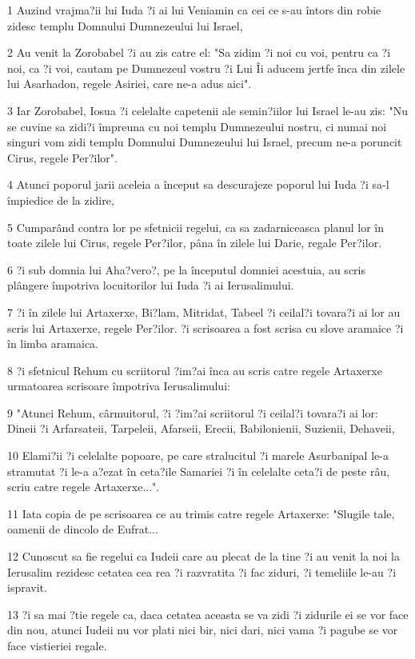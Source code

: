 \par 1 Auzind vrajma?ii lui Iuda ?i ai lui Veniamin ca cei ce s-au întors din robie zidesc templu Domnului Dumnezeului lui Israel,
\par 2 Au venit la Zorobabel ?i au zis catre el: "Sa zidim ?i noi cu voi, pentru ca ?i noi, ca ?i voi, cautam pe Dumnezeul vostru ?i Lui Îi aducem jertfe înca din zilele lui Asarhadon, regele Asiriei, care ne-a adus aici".
\par 3 Iar Zorobabel, Iosua ?i celelalte capetenii ale semin?iilor lui Israel le-au zis: "Nu se cuvine sa zidi?i împreuna cu noi templu Dumnezeului nostru, ci numai noi singuri vom zidi templu Domnului Dumnezeului lui Israel, precum ne-a poruncit Cirus, regele Per?ilor".
\par 4 Atunci poporul jarii aceleia a început sa descurajeze poporul lui Iuda ?i sa-l împiedice de la zidire,
\par 5 Cumparând contra lor pe sfetnicii regelui, ca sa zadarniceasca planul lor în toate zilele lui Cirus, regele Per?ilor, pâna în zilele lui Darie, regale Per?ilor.
\par 6 ?i sub domnia lui Aha?vero?, pe la începutul domniei acestuia, au scris plângere împotriva locuitorilor lui Iuda ?i ai Ierusalimului.
\par 7 ?i în zilele lui Artaxerxe, Bi?lam, Mitridat, Tabeel ?i ceilal?i tovara?i ai lor au scris lui Artaxerxe, regele Per?ilor. ?i scrisoarea a fost scrisa cu slove aramaice ?i în limba aramaica.
\par 8 ?i sfetnicul Rehum cu scriitorul ?im?ai înca au scris catre regele Artaxerxe urmatoarea scrisoare împotriva Ierusalimului:
\par 9 "Atunci Rehum, cârmuitorul, ?i ?im?ai scriitorul ?i ceilal?i tovara?i ai lor: Dineii ?i Arfarsateii, Tarpeleii, Afarseii, Erecii, Babilonienii, Suzienii, Dehaveii,
\par 10 Elami?ii ?i celelalte popoare, pe care stralucitul ?i marele Asurbanipal le-a stramutat ?i le-a a?ezat în ceta?ile Samariei ?i în celelalte ceta?i de peste râu, scriu catre regele Artaxerxe...".
\par 11 Iata copia de pe scrisoarea ce au trimis catre regele Artaxerxe: "Slugile tale, oamenii de dincolo de Eufrat...
\par 12 Cunoscut sa fie regelui ca Iudeii care au plecat de la tine ?i au venit la noi la Ierusalim rezidesc cetatea cea rea ?i razvratita ?i fac ziduri, ?i temeliile le-au ?i ispravit.
\par 13 ?i sa mai ?tie regele ca, daca cetatea aceasta se va zidi ?i zidurile ei se vor face din nou, atunci Iudeii nu vor plati nici bir, nici dari, nici vama ?i pagube se vor face vistieriei regale.
